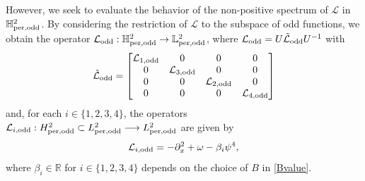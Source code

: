 \documentclass[10pt,reqno,a4paper]{amsart} %
\theoremstyle{definition} %
\numberwithin{equation}{section}
\numberwithin{figure}{section}
\begin{document}
However, we seek to evaluate the behavior of the non-positive spectrum of $\mathcal{L}$ in $\mathbb{H}^2_{\rm per,odd}$. By considering the restriction of $\mathcal{L}$ to the subspace of odd functions, we obtain the operator $\mathcal{L}_{\rm odd}: \mathbb{H}^2_{\rm per,odd} \rightarrow \mathbb{L}^2_{\rm per,odd}$, where $\mathcal{L}_{\rm odd} = U \tilde{\mathcal{L}}_{\rm odd} U^{-1}$ with
\begin{equation*}
 {\tilde{\mathcal{L}}_{\rm odd}}= \begin{bmatrix}
\mathcal{L}_{\rm 1,odd} & 0 & 0 & 0 \\
0 & \mathcal{L}_{\rm 3,odd} & 0 & 0 \\
0 & 0 & \mathcal{L}_{\rm 2,odd} & 0 \\
0 & 0 & 0 & \mathcal{L}_{\rm 4,odd}
\end{bmatrix}
\end{equation*}
and, for each $i \in \{1,2,3,4\}$, the operators $\mathcal{L}_{i,\rm odd}:H^2_{\rm per, odd} \subset L^2_{\rm per, odd} \longrightarrow L^2_{\rm  per, odd}$ are given by
\begin{equation*}
\mathcal{L}_{i,\rm odd} = -\partial_x^2 + \omega - \beta_i \psi^4,
\end{equation*}
where $\beta_i \in \mathbb{R}$ for $i \in \{1,2,3,4\}$ depends on the choice of $B$ in \eqref{Bvalue}.
\end{document}
